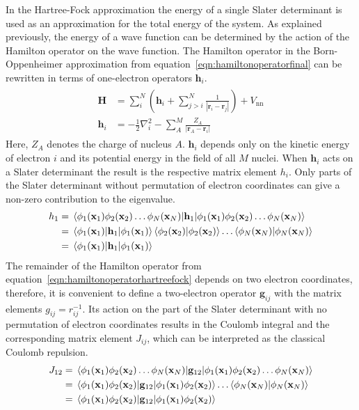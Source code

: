 In the Hartree-Fock approximation the energy of a single Slater determinant is
used as an approximation for the total energy of the system. As explained
previously, the energy of a wave function can be determined by the action of
the Hamilton operator on the wave function. The Hamilton operator in the
Born-Oppenheimer approximation from equation~\eqref{eqn:hamiltonoperatorfinal}
can be rewritten in terms of one-electron operators $\mathbf{h}_i$.
%
\begin{align}
\begin{aligned}
    \mathbf{H}&=\sum_i^N\left(\mathbf{h}_i + \sum_{j>i}^N\frac{1}{|\mathbf{r}_i-\mathbf{r}_j|}\right) + V_\text{nn} \\
    \mathbf{h}_i&=-\frac{1}{2}\nabla_i^2-\sum_A^M\frac{Z_A}{|\mathbf{r}_A-\mathbf{r}_i|}\label{eqn:hamiltonoperatorhartreefock}
\end{aligned}
\end{align}
%
Here, $Z_A$ denotes the charge of nucleus $A$. $\mathbf{h}_i$ depends only on
the kinetic energy of electron $i$ and its potential energy in the field of all
$M$ nuclei. When $\mathbf{h}_i$ acts on a Slater determinant the result is the
respective matrix element $h_i$. Only parts of the Slater determinant without
permutation of electron coordinates can give a non-zero contribution to the
eigenvalue.
%
\begin{align}
    \begin{aligned}
        h_1&=\mel{\phi_1(\mathbf{x}_1)\phi_2(\mathbf{x}_2)\ldots\phi_N(\mathbf{x}_N)}{\mathbf{h}_1}{\phi_1(\mathbf{x}_1)\phi_2(\mathbf{x}_2)\ldots\phi_N(\mathbf{x}_N)}\\
        &=\mel{\phi_1(\mathbf{x}_1)}{\mathbf{h}_1}{\phi_1(\mathbf{x}_1)}\braket{\phi_2(\mathbf{x}_2)}\ldots\braket{\phi_N(\mathbf{x}_N)} \\
        &=\mel{\phi_1(\mathbf{x}_1)}{\mathbf{h}_1}{\phi_1(\mathbf{x}_1)}
    \end{aligned}
\end{align}
%
The remainder of the Hamilton operator from
equation~\eqref{eqn:hamiltonoperatorhartreefock} depends on two electron
coordinates, therefore, it is convenient to define a two-electron operator
$\mathbf{g}_{ij}$ with the matrix elements $g_{ij}=r_{ij}^{-1}$. Its action on
the part of the Slater determinant with no permutation of electron coordinates
results in the Coulomb integral and the corresponding matrix element $J_{ij}$,
which can be interpreted as the classical Coulomb repulsion.
%
\begin{align}
    \begin{aligned}
        J_{12}&=\mel{\phi_1(\mathbf{x}_1)\phi_2(\mathbf{x}_2)\ldots\phi_N(\mathbf{x}_N)}{\mathbf{g}_{12}}{\phi_1(\mathbf{x}_1)\phi_2(\mathbf{x}_2)\ldots\phi_N(\mathbf{x}_N)}\\
        &=\mel{\phi_1(\mathbf{x}_1)\phi_2(\mathbf{x}_2)}{\mathbf{g}_{12}}{\phi_1(\mathbf{x}_1)\phi_2(\mathbf{x}_2)}\ldots\braket{\phi_N(\mathbf{x}_N)} \\
        &=\mel{\phi_1(\mathbf{x}_1)\phi_2(\mathbf{x}_2)}{\mathbf{g}_{12}}{\phi_1(\mathbf{x}_1)\phi_2(\mathbf{x}_2)}
    \end{aligned}
\end{align}
